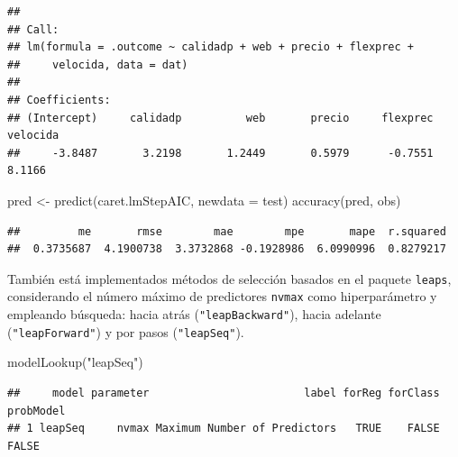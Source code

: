 \documentclass[
]{book}
\newenvironment{Shaded}{\begin{snugshade}}{\end{snugshade}}
\newcommand{\AttributeTok}[1]{\textcolor[rgb]{0.77,0.63,0.00}{#1}}
\newcommand{\FunctionTok}[1]{\textcolor[rgb]{0.00,0.00,0.00}{#1}}
\newcommand{\NormalTok}[1]{#1}
\newcommand{\OtherTok}[1]{\textcolor[rgb]{0.56,0.35,0.01}{#1}}
\newcommand{\SpecialCharTok}[1]{\textcolor[rgb]{0.00,0.00,0.00}{#1}}
\newcommand{\StringTok}[1]{\textcolor[rgb]{0.31,0.60,0.02}{#1}}
\theoremstyle{break}
\theoremstyle{definition}
\theoremstyle{definition}
\theoremstyle{definition}
\theoremstyle{definition}
\theoremstyle{remark}
\begin{document}
\begin{Shaded}
\end{Shaded}

\begin{verbatim}
## 
## Call:
## lm(formula = .outcome ~ calidadp + web + precio + flexprec + 
##     velocida, data = dat)
## 
## Coefficients:
## (Intercept)     calidadp          web       precio     flexprec     velocida  
##     -3.8487       3.2198       1.2449       0.5979      -0.7551       8.1166
\end{verbatim}

\begin{Shaded}
\begin{Highlighting}[]
\NormalTok{pred }\OtherTok{\textless{}{-}} \FunctionTok{predict}\NormalTok{(caret.lmStepAIC, }\AttributeTok{newdata =}\NormalTok{ test)}
\FunctionTok{accuracy}\NormalTok{(pred, obs)}
\end{Highlighting}
\end{Shaded}

\begin{verbatim}
##         me       rmse        mae        mpe       mape  r.squared 
##  0.3735687  4.1900738  3.3732868 -0.1928986  6.0990996  0.8279217
\end{verbatim}

También está implementados métodos de selección basados en el paquete \texttt{leaps}, considerando el número máximo de predictores \texttt{nvmax} como hiperparámetro y empleando búsqueda: hacia atrás (\texttt{"leapBackward"}), hacia adelante (\texttt{"leapForward"}) y por pasos (\texttt{"leapSeq"}).

\begin{Shaded}
\begin{Highlighting}[]
\FunctionTok{modelLookup}\NormalTok{(}\StringTok{"leapSeq"}\NormalTok{)}
\end{Highlighting}
\end{Shaded}

\begin{verbatim}
##     model parameter                        label forReg forClass probModel
## 1 leapSeq     nvmax Maximum Number of Predictors   TRUE    FALSE     FALSE
\end{verbatim}
\end{document}

